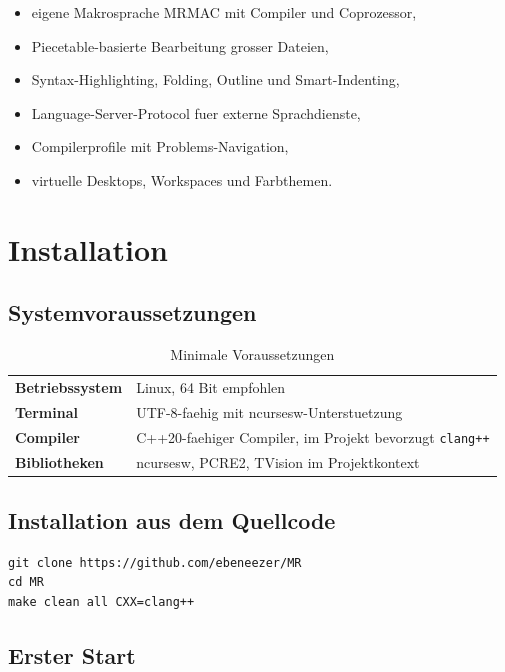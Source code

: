 \documentclass[a4paper,11pt]{report}
\newcommand{\mrmac}{\textsc{MRMAC}}
\begin{document}
\begin{itemize}
\item eigene Makrosprache \mrmac{} mit Compiler und Coprozessor,
\item Piecetable-basierte Bearbeitung grosser Dateien,
\item Syntax-Highlighting, Folding, Outline und Smart-Indenting,
\item Language-Server-Protocol fuer externe Sprachdienste,
\item Compilerprofile mit Problems-Navigation,
\item virtuelle Desktops, Workspaces und Farbthemen.
\end{itemize}

\chapter{Installation}

\section{Systemvoraussetzungen}

\begin{table}[h]
\centering
\begin{tabular}{>{\bfseries}p{}p{}}
Betriebssystem & Linux, 64 Bit empfohlen\\
Terminal & UTF-8-faehig mit ncursesw-Unterstuetzung\\
Compiler & C++20-faehiger Compiler, im Projekt bevorzugt \texttt{clang++}\\
Bibliotheken & ncursesw, PCRE2, TVision im Projektkontext\\
\end{tabular}
\caption{Minimale Voraussetzungen}
\end{table}

\section{Installation aus dem Quellcode}

\begin{verbatim}
git clone https://github.com/ebeneezer/MR
cd MR
make clean all CXX=clang++
\end{verbatim}

\section{Erster Start}
\end{document}
